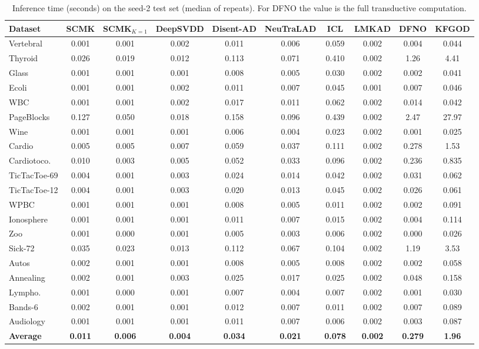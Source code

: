 \begin{table}[t]
\centering
\caption{Inference time (seconds) on the seed-2 test set (median of repeats). For DFNO the value is the full transductive computation.}
\label{tab:runtime-infer}
\scriptsize
\setlength{\tabcolsep}{4pt}
\begin{tabular}{lccccccccc}
\toprule
Dataset & SCMK & SCMK$_{K=1}$ & DeepSVDD & Disent-AD & NeuTraLAD & ICL & LMKAD & DFNO & KFGOD \\
\midrule
Vertebral    & 0.001 & 0.001 & 0.002 & 0.011 & 0.006 & 0.059 & 0.002 & 0.004 & 0.044 \\
Thyroid      & 0.026 & 0.019 & 0.012 & 0.113 & 0.071 & 0.410 & 0.002 & 1.26 & 4.41 \\
Glass        & 0.001 & 0.001 & 0.001 & 0.008 & 0.005 & 0.030 & 0.002 & 0.002 & 0.041 \\
Ecoli        & 0.001 & 0.001 & 0.002 & 0.011 & 0.007 & 0.045 & 0.001 & 0.007 & 0.046 \\
WBC          & 0.001 & 0.001 & 0.002 & 0.017 & 0.011 & 0.062 & 0.002 & 0.014 & 0.042 \\
PageBlocks   & 0.127 & 0.050 & 0.018 & 0.158 & 0.096 & 0.439 & 0.002 & 2.47 & 27.97 \\
Wine         & 0.001 & 0.001 & 0.001 & 0.006 & 0.004 & 0.023 & 0.002 & 0.001 & 0.025 \\
Cardio       & 0.005 & 0.005 & 0.007 & 0.059 & 0.037 & 0.111 & 0.002 & 0.278 & 1.53 \\
Cardiotoco.  & 0.010 & 0.003 & 0.005 & 0.052 & 0.033 & 0.096 & 0.002 & 0.236 & 0.835 \\
TicTacToe-69 & 0.004 & 0.001 & 0.003 & 0.024 & 0.014 & 0.042 & 0.002 & 0.031 & 0.062 \\
TicTacToe-12 & 0.004 & 0.001 & 0.003 & 0.020 & 0.013 & 0.045 & 0.002 & 0.026 & 0.061 \\
WPBC         & 0.001 & 0.001 & 0.001 & 0.008 & 0.005 & 0.011 & 0.002 & 0.002 & 0.091 \\
Ionosphere   & 0.001 & 0.001 & 0.001 & 0.011 & 0.007 & 0.015 & 0.002 & 0.004 & 0.114 \\
Zoo          & 0.001 & 0.000 & 0.001 & 0.005 & 0.003 & 0.006 & 0.002 & 0.000 & 0.026 \\
Sick-72      & 0.035 & 0.023 & 0.013 & 0.112 & 0.067 & 0.104 & 0.002 & 1.19 & 3.53 \\
Autos        & 0.002 & 0.001 & 0.001 & 0.008 & 0.005 & 0.008 & 0.002 & 0.002 & 0.058 \\
Annealing    & 0.002 & 0.001 & 0.003 & 0.025 & 0.017 & 0.025 & 0.002 & 0.048 & 0.158 \\
Lympho.      & 0.001 & 0.000 & 0.001 & 0.007 & 0.004 & 0.007 & 0.002 & 0.001 & 0.030 \\
Bands-6      & 0.002 & 0.001 & 0.001 & 0.012 & 0.007 & 0.011 & 0.002 & 0.007 & 0.089 \\
Audiology    & 0.001 & 0.001 & 0.001 & 0.011 & 0.007 & 0.006 & 0.002 & 0.003 & 0.087 \\
\midrule
\textbf{Average} & \textbf{0.011} & \textbf{0.006} & \textbf{0.004} & \textbf{0.034} & \textbf{0.021} & \textbf{0.078} & \textbf{0.002} & \textbf{0.279} & \textbf{1.96} \\
\bottomrule
\end{tabular}
\end{table}